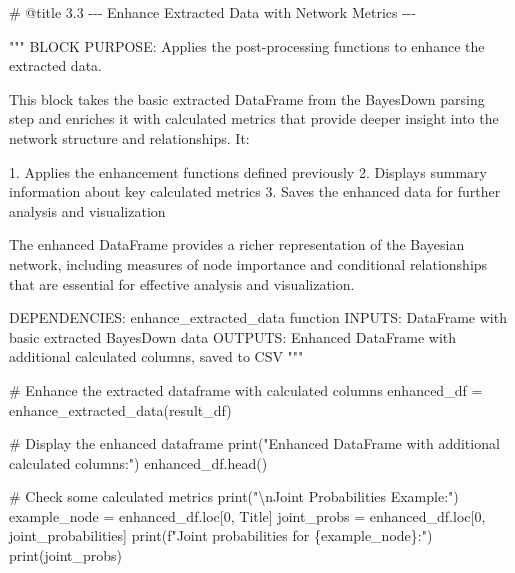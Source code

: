 \documentclass[
  11pt,
  letterpaper,
]{book}
\newenvironment{Shaded}{\begin{snugshade}}{\end{snugshade}}
\newcommand{\BuiltInTok}[1]{\textcolor[rgb]{0.00,0.23,0.31}{#1}}
\newcommand{\CharTok}[1]{\textcolor[rgb]{0.13,0.47,0.30}{#1}}
\newcommand{\CommentTok}[1]{\textcolor[rgb]{0.37,0.37,0.37}{#1}}
\newcommand{\DecValTok}[1]{\textcolor[rgb]{0.68,0.00,0.00}{#1}}
\newcommand{\NormalTok}[1]{\textcolor[rgb]{0.00,0.23,0.31}{#1}}
\newcommand{\OperatorTok}[1]{\textcolor[rgb]{0.37,0.37,0.37}{#1}}
\newcommand{\SpecialCharTok}[1]{\textcolor[rgb]{0.37,0.37,0.37}{#1}}
\newcommand{\SpecialStringTok}[1]{\textcolor[rgb]{0.13,0.47,0.30}{#1}}
\newcommand{\StringTok}[1]{\textcolor[rgb]{0.13,0.47,0.30}{#1}}
\begin{document}
\begin{Shaded}
\begin{Highlighting}[]
\CommentTok{\# @title 3.3 {-}{-}{-} Enhance Extracted Data with Network Metrics {-}{-}{-}}

\CommentTok{"""}
\CommentTok{BLOCK PURPOSE: Applies the post{-}processing functions to enhance the extracted data.}

\CommentTok{This block takes the basic extracted DataFrame from the BayesDown parsing step}
\CommentTok{and enriches it with calculated metrics that provide deeper insight into the}
\CommentTok{network structure and relationships. It:}

\CommentTok{1. Applies the enhancement functions defined previously}
\CommentTok{2. Displays summary information about key calculated metrics}
\CommentTok{3. Saves the enhanced data for further analysis and visualization}

\CommentTok{The enhanced DataFrame provides a richer representation of the Bayesian network,}
\CommentTok{including measures of node importance and conditional relationships that are}
\CommentTok{essential for effective analysis and visualization.}

\CommentTok{DEPENDENCIES: enhance\_extracted\_data function}
\CommentTok{INPUTS: DataFrame with basic extracted BayesDown data}
\CommentTok{OUTPUTS: Enhanced DataFrame with additional calculated columns, saved to CSV}
\CommentTok{"""}

\CommentTok{\# Enhance the extracted dataframe with calculated columns}
\NormalTok{enhanced\_df }\OperatorTok{=}\NormalTok{ enhance\_extracted\_data(result\_df)}

\CommentTok{\# Display the enhanced dataframe}
\BuiltInTok{print}\NormalTok{(}\StringTok{"Enhanced DataFrame with additional calculated columns:"}\NormalTok{)}
\NormalTok{enhanced\_df.head()}

\CommentTok{\# Check some calculated metrics}
\BuiltInTok{print}\NormalTok{(}\StringTok{"}\CharTok{\textbackslash{}n}\StringTok{Joint Probabilities Example:"}\NormalTok{)}
\NormalTok{example\_node }\OperatorTok{=}\NormalTok{ enhanced\_df.loc[}\DecValTok{0}\NormalTok{, }\StringTok{\textquotesingle{}Title\textquotesingle{}}\NormalTok{]}
\NormalTok{joint\_probs }\OperatorTok{=}\NormalTok{ enhanced\_df.loc[}\DecValTok{0}\NormalTok{, }\StringTok{\textquotesingle{}joint\_probabilities\textquotesingle{}}\NormalTok{]}
\BuiltInTok{print}\NormalTok{(}\SpecialStringTok{f"Joint probabilities for }\SpecialCharTok{\{}\NormalTok{example\_node}\SpecialCharTok{\}}\SpecialStringTok{:"}\NormalTok{)}
\BuiltInTok{print}\NormalTok{(joint\_probs)}


\end{Highlighting}
\end{Shaded}
\end{document}
